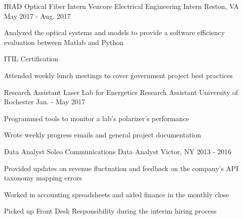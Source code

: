 \begin{cventries}
  \cventry
    {IRAD Optical Fiber Intern}
    {Vencore Electrical Engineering Intern}
    {Reston, VA}
    {May 2017 - Aug. 2017}
    {
      \begin{cvitems}
        \item {Analyzed the optical systems and models to provide a software efficiency evaluation between Matlab and Python}
        \item {ITIL Certification}
        \item {Attended weekly lunch meetings to cover government project best practices}
      \end{cvitems}
    }
  \cventry
    {Research Assistant}
    {Laser Lab for Energetics Research Assistant}
    {University of Rochester}
    {Jan. - May 2017}
    {
      \begin{cvitems}
        \item {Programmed tools to monitor a lab's polarizer's performance}
        \item {Wrote weekly progress emails and general project documentation}
      \end{cvitems}
    }
  \cventry
    {Data Analyst}
    {Soleo Communications Data Analyst}
    {Victor, NY}
    {2013 - 2016}
    {
      \begin{cvitems}
        \item {Provided updates on revenue fluctuation and feedback on the company's API taxonomy mapping errors}
        \item{Worked in accounting spreadsheets and aided finance in the monthly close}
        \item{Picked up Front Desk Responsibility during the interim hiring process}
      \end{cvitems}
    }    
\end{cventries}
